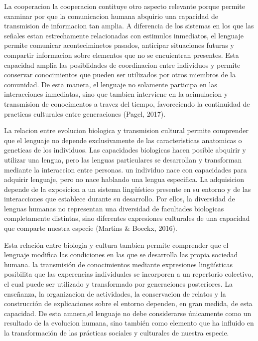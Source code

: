\documentclass[12pt]{article}
\begin{document}
La cooperacion la cooperacion contituye otro aspecto relevante porque permite examinar por que la comunicacion humana abquirio una capacidad de transmision de informacion tan amplia. A diferencia de los sistemas en los que las señales estan estrechamente relacionadas con estimulos inmediatos, el lenguaje permite comunicar aconteciminetos pasados, anticipar situaciones futuras y compartir informacion sobre elementos que no se encuientran presentes. Esta capacidad amplia las posiblidades de coordinacion entre individuos y permite conservar conocimientos que pueden ser utilizados por otros miembros de la comunidad. De esta manera, el lenguaje no solamente participa en las interacciones inmediatas, sino que tambien interviene en la acimulacion y transmision de conocimentos a travez del tiempo, favoreciendo la continuidad de practicas culturales entre generaciones (Pagel, 2017).

La relacion entre evolucion biologica y transmision cultural permite comprender que el lenguaje no depende exclusivamente de las caracteristicas anatomicas o geneticas de los individuos. Las capacidades biologicas hacen posible abquirir y utilizar una lengua, pero las lenguas particulares se desarrollan y transforman mediante la interaccion entre personas. un individuo nace con capacidades para adquirir lenguaje, pero no nace hablando una lengua especifica. La adquisicion depende de la exposicion a un sistema lingüístico presente en su entorno y de las interacciones que establece durante su desarrollo. Por ellos, la diversidad de lenguas humanas no representan una diversidad de facultades biologicas completamente distintas, sino diferentes expresiones culturales de una capacidad que comparte nuestra especie (Martins \& Boeckx, 2016).

Esta relación entre biologia y cultura tambien permite comprender que el lenguaje modifica las condiciones en las que se desarrolla las propia sociedad humana. la transmisión de conocimientos mediante expresiones lingüísticas posibilita que las experencias individuales se incorporen a un repertorio colectivo, el cual puede ser utilizado y transformado por generaciones posteriores. La enseñanza, la organizacion de actividades, la conservacion de relatos y la construcción de explicaciones sobre el entorno dependen, en gran medida, de esta capacidad. De esta amnera,el lenguaje no debe considerarse únicamente como un resultado de la evolucion humana, sino también como elemento que ha influido en la transformación de las prácticas sociales y culturales de nuestra especie.
\end{document}

